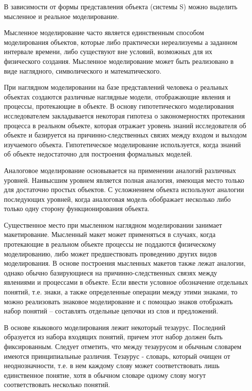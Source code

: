     В зависимости от формы представления объекта (системы S) можно выделить мысленное и реальное моделирование.

    Мысленное моделирование часто является единственным способом моделирования объектов, которые либо практически нереализуемы а заданном интервале времени, либо существуют вне условий, возможных для их физического создания. Мысленное моделирование может быть реализовано в виде наглядного, символического и математического.

    При наглядном моделировании на базе представлений человека о реальных объектах создаются различные наглядные модели, отображающие явления и процессы, протекающие в объекте. В основу гипотетического моделирования исследователем закладывается некоторая гипотеза о закономерностях протекания процесса в реальном объекте, которая отражает уровень знаний исследователя об объекте и базируется на причинно-следственных связях между входом и выходом изучаемого объекта. Гипотетическое моделирование используется, когда знаний об объекте недостаточно для построения формальных моделей.

    Аналоговое моделирование основывается на применении аналогий различных уровней. Наивысшим уровнем является полная аналогия, имеющая место только для достаточно простых объектов. С усложнением объекта используют аналогии последующих уровней, когда аналоговая модель обображает несколько либо только одну сторону функционирования объекта.

    Существенное место при мысленном наглядном моделировании занимает макетирование. Мысленный макет может применяться в случаях, когда протекающие в реальном объекте процессы не поддаются физическому моделированию, либо может предшествовать проведению других видов моделирования. В основе построения мысленных макетов также лежат аналогии, однако обычно базирующиеся на причинно-следственных связях между явлениями и процессами в объекте. Если ввести условное обозначение отдельных понятий, т.е. знаки, а также определенные операции между этими знаками, то можно реализовать знаковое моделирование и с помощью знаков отображать набор понятий -- составлять отдельные цепочки из слов и предложений.

    В основе языкового моделирования лежит некоторый тезаурус. Последний образуется из набора входящих понятий, причем этот набор должен быть фиксированным. Следует отметить, что между тезаурусом и обычным словарем имеются принципиальные различия. Тезаурус - словарь, который очищен от неоднозначности, т.е. в нем каждому слову может соответствовать лишь единственное понятие, хотя в обычном словаре одному слову могут соответствовать несколько понятий.

